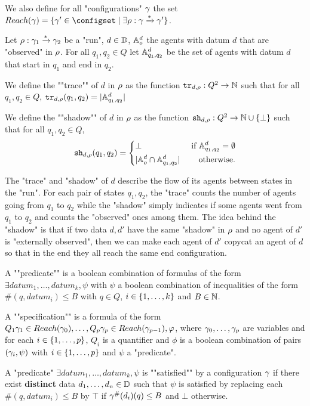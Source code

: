 We also define for all "configurations" $\gamma$ the set $\Reach(\config) = \set{\config' \in \configset \mid \exists \run : \config \xrightarrow{*} \config'}$.


\begin{definition}
	Let $\rho : \gamma_1 \xrightarrow{*} \gamma_2$ be a "run", $d\in \mathbb{D}$, $\mathbb{A}^d_o$ the agents with datum $d$ that are "observed" in $\rho$. For all $q_1, q_2 \in Q$ let $\mathbb{A}^d_{q_1, q_2}$ be the set of agents with datum $d$ that start in $q_1$ and end in $q_2$.
	
	We define the ""trace"" of $d$ in $\rho$ as the function $\mathtt{tr}_{d,\rho} : Q^2 \to \mathbb{N}$ such that for all $q_1, q_2 \in Q$,	$\mathtt{tr}_{d,\rho}(q_1, q_2) = |\mathbb{A}^d_{q_1, q_2}|$
		
	
	\AP We define the ""shadow"" of $d$ in $\rho$ as the function $\mathtt{sh}_{d,\rho} : Q^2 \to \mathbb{N} \cup \{\bot\}$ such that for all $q_1, q_2 \in Q$, 
	\begin{equation}
		\mathtt{sh}_{d,\rho}(q_1, q_2) = 
		\left\{
		\begin{aligned}
			&\bot &\text{ if } \mathbb{A}^d_{q_1,q_2} =\emptyset\\
			&|\mathbb{A}^d_o \cap \mathbb{A}^d_{q_1, q_2}| &\text{ otherwise.}
		\end{aligned}
		\right.
	\end{equation}
\end{definition}
%	
The "trace" and "shadow" of $d$ describe the flow of its agents between states in the "run". For each pair of states $q_1, q_2$, the "trace" counts the number of agents going from $q_1$ to $q_2$ while
the "shadow" simply indicates if some agents went from $q_1$ to $q_2$ and counts the "observed" ones among them. The idea behind the "shadow" is that if two data $d, d'$ have the same "shadow" in $\rho$ and no agent of $d'$ is "externally observed", then we can make each agent of $d'$ copycat an agent of $d$ so that in the end they all reach the same end configuration.


\begin{definition}
	A ""predicate"" is a boolean combination of formulas of the form $\exists datum_1, \ldots, datum_k, \psi$ with $\psi$ a boolean combination of inequalities of the form $\#(q,datum_i) \leq B$ with $q\in Q$, $i \in \{1,\dots,k\}$ and $B \in \mathbb{N}$.
	
	A ""specification"" is a formula of the form $Q_1 \gamma_1  \in Reach(\gamma_0), \ldots, Q_p \gamma_p \in Reach(\gamma_{p-1}), \varphi$, where $\gamma_0, \ldots, \gamma_{p}$ are variables and for each $i \in \{1,\dots,p\}$, $Q_i$ is a quantifier and $\phi$ is a boolean combination of pairs $(\gamma_i, \psi)$ with $i \in \{1,\dots,p\}$ and $\psi$ a "predicate".
	
\end{definition}

A "predicate" $\exists datum_1, \ldots, datum_k, \psi$ is ""satisfied"" by a configuration $\gamma$ if there exist \textbf{distinct} data $d_1, \ldots, d_n \in \mathbb{D}$ such that $\psi$ is satisfied by replacing each $\#(q,datum_i) \leq B$ by $\top$ if $\gamma^{\#}(d_i)(q) \leq B$ and $\bot$ otherwise.
